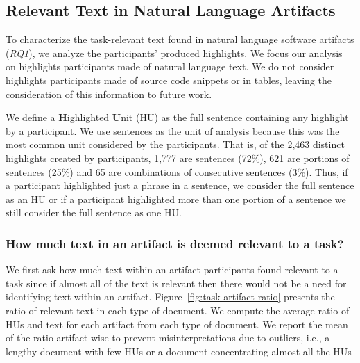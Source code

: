 \subsection{Relevant Text in Natural Language Artifacts}




To characterize the task-relevant text found in natural language 
software artifacts (\textit{RQ1}), 
we analyze the participants' produced highlights.
We focus
our analysis on highlights participants made of natural language
text. We do not
consider highlights participants made of source code snippets or in
tables, leaving the consideration of this information to future work.



We define a \textbf{H}ighlighted \textbf{U}nit (HU) as the full sentence containing any
highlight by a participant. 
We use sentences as the unit of analysis 
because this was the most common unit considered by the participants.
That is, of the 2,463
distinct highlights created by participants, 1,777 are sentences
(72\%), 621 are portions of sentences (25\%) and 65 are combinations
of consecutive sentences (3\%). 
Thus, if a participant highlighted just a
phrase in a sentence, we consider the full sentence as an HU or if a
participant highlighted more than one portion of a sentence we still
consider the full sentence as one HU. 


\subsubsection{How much text in an artifact is deemed relevant to a task?}
\label{cp3:ratio}




We first ask how much text within an artifact participants found relevant to a task
since if almost all of the text  is relevant then there would not be a need for
identifying text within an artifact.
Figure~\ref{fig:task-artifact-ratio} presents the ratio of relevant text in each type of document.
We compute the average ratio of HUs and text for each  artifact from each type of document.
We report the mean of the ratio artifact-wise to prevent misinterpretations due to outliers,
i.e., a lengthy document with few HUs or a document concentrating almost all the HUs






